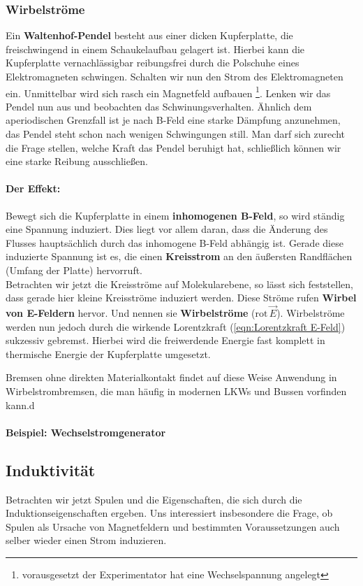 \subsubsection{Wirbelströme}
Ein \textbf{Waltenhof-Pendel} besteht aus einer dicken Kupferplatte, die freischwingend in einem Schaukelaufbau gelagert ist. Hierbei kann die Kupferplatte vernachlässigbar reibungsfrei durch die Polschuhe eines Elektromagneten schwingen.
Schalten wir nun den Strom des Elektromagneten ein. Unmittelbar wird sich rasch ein Magnetfeld aufbauen \footnote{vorausgesetzt der Experimentator hat eine Wechselspannung angelegt}. Lenken wir das Pendel nun aus und beobachten das Schwinungsverhalten.
Ähnlich dem aperiodischen Grenzfall ist je nach B-Feld eine starke Dämpfung anzunehmen, das Pendel steht schon nach wenigen Schwingungen still.
Man darf sich zurecht die Frage stellen, welche Kraft das Pendel beruhigt hat, schließlich können wir eine starke Reibung ausschließen.

\paragraph{Der Effekt:} Bewegt sich die Kupferplatte in einem \textbf{inhomogenen B-Feld}, so wird ständig eine Spannung induziert. Dies liegt vor allem daran, dass die Änderung des Flusses hauptsächlich durch das inhomogene B-Feld abhängig ist. 
Gerade diese induzierte Spannung ist es, die einen \textbf{Kreisstrom} an den äußersten Randflächen (Umfang der Platte) hervorruft. \\
Betrachten wir jetzt die Kreisströme auf Molekularebene, so lässt sich feststellen, dass gerade hier kleine Kreisströme induziert werden. 
Diese Ströme rufen \textbf{Wirbel von E-Feldern} hervor. Und nennen sie \textbf{Wirbelströme} ($ \mathrm{rot} \, \vec{E} $). Wirbelströme werden nun jedoch durch die wirkende Lorentzkraft (\ref{eqn:Lorentzkraft E-Feld}) sukzessiv gebremst. Hierbei wird die freiwerdende Energie fast komplett in thermische Energie der Kupferplatte umgesetzt.

Bremsen ohne direkten Materialkontakt findet auf diese Weise Anwendung in Wirbelstrombremsen, die man häufig in modernen LKWs und Bussen vorfinden kann.d

\paragraph{Beispiel: Wechselstromgenerator}


\subsection{Induktivität}
Betrachten wir jetzt Spulen und die Eigenschaften, die sich durch die Induktionseigenschaften ergeben.
Uns interessiert insbesondere die Frage, ob Spulen als Ursache von Magnetfeldern und bestimmten Voraussetzungen auch selber wieder einen Strom induzieren.

